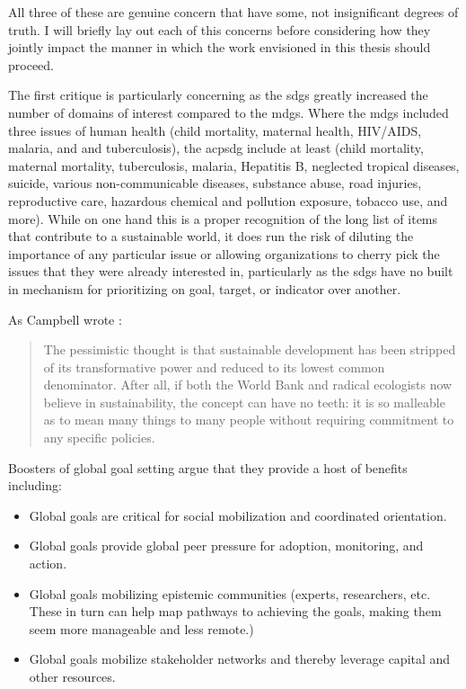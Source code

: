 All three of these are genuine concern that have some, not insignificant degrees of truth. I will briefly lay out each of this concerns before considering how they jointly impact the manner in which the work envisioned in this thesis should proceed.

The first critique is particularly concerning as the \acp{sdg} greatly increased the number of domains of interest compared to the \acp{mdg}. Where the \acp{mdg} included three issues of human health (child mortality, maternal health, HIV/AIDS, malaria, and and tuberculosis), the acp{sdg} include at least (child mortality, maternal mortality, tuberculosis, malaria, Hepatitis B, neglected tropical diseases, suicide, various non-communicable diseases, substance abuse, road injuries, reproductive care, hazardous chemical and pollution exposure, tobacco use, and more). While on one hand this is a proper recognition of the long list of items that contribute to a sustainable world, it does run the risk of diluting the importance of any particular issue or allowing organizations to cherry pick the issues that they were already interested in, particularly as the \acp{sdg} have no built in mechanism for prioritizing on goal, target, or indicator over another.  

As Campbell wrote \cite{campbellGreenCitiesGrowing2016}:

\blockquote{The pessimistic thought is that sustainable development has been stripped of its transformative power and reduced to its lowest common denominator. After all, if both the World Bank and radical ecologists now believe in sustainability, the concept can have no teeth: it is so malleable as to mean many things to many people without requiring commitment to any specific policies.}

Boosters of global goal setting argue that they provide a host of benefits including: 

\begin{itemize} \setlength{\itemsep}{0pt} \setlength{\parskip}{0pt}%
	\item{Global goals are critical for social mobilization and coordinated orientation.}
	\item{Global goals provide global peer pressure for adoption, monitoring, and action.}
	\item{Global goals mobilizing epistemic communities (experts, researchers, etc. These in turn can help map pathways to achieving the goals, making them seem more manageable and less remote.)}
	\item{Global goals mobilize stakeholder networks and thereby leverage capital and other resources.}
\end{itemize}

